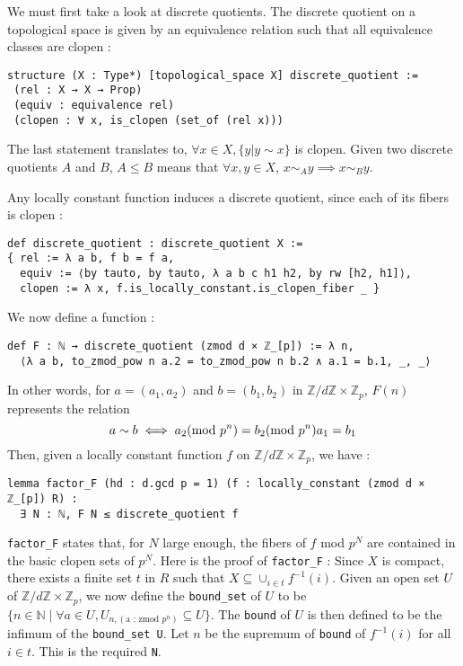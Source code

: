\documentclass[a4paper,UKenglish,cleveref, autoref, thm-restate]{lipics-v2021}
\newcommand{\lean}[1]{\texttt{#1}\xspace} %
\begin{document}
We must first take a look at discrete quotients. The discrete quotient on a topological space is given by an equivalence relation such 
that all equivalence classes are clopen : 
\begin{lstlisting}
structure (X : Type*) [topological_space X] discrete_quotient :=
 (rel : X → X → Prop)
 (equiv : equivalence rel)
 (clopen : ∀ x, is_clopen (set_of (rel x)))
\end{lstlisting}

The last statement translates to, $\forall x \in X, \{ y | y \sim x \}$ is clopen. 
Given two discrete quotients $A$ and $B$, $A \le B$ means that $\forall x,y \in X$, 
$x \sim_{A} y \implies x \sim_{B} y$. 

Any locally constant function induces a discrete quotient, since each of its fibers is clopen : 
\begin{lstlisting}
def discrete_quotient : discrete_quotient X :=
{ rel := λ a b, f b = f a,
  equiv := ⟨by tauto, by tauto, λ a b c h1 h2, by rw [h2, h1]⟩,
  clopen := λ x, f.is_locally_constant.is_clopen_fiber _ }
\end{lstlisting}

We now define a function : 
\begin{lstlisting}
def F : ℕ → discrete_quotient (zmod d × ℤ_[p]) := λ n, 
  ⟨λ a b, to_zmod_pow n a.2 = to_zmod_pow n b.2 ∧ a.1 = b.1, _, _⟩
\end{lstlisting}

In other words, for $a = (a_1, a_2)$ and $b = (b_1, b_2)$ in $\mathbb{Z}/d \mathbb{Z} \times \mathbb{Z}_p$, $F(n)$ represents the relation 
$$ a \sim b \iff a_2 (\text{mod } p^n) = b_2 (\text{mod } p^n) \and a_1 = b_1 $$
Then, given a locally constant function $f$ on $\mathbb{Z}/d \mathbb{Z} \times \mathbb{Z}_p$, we have :
\begin{lstlisting}
lemma factor_F (hd : d.gcd p = 1) (f : locally_constant (zmod d × ℤ_[p]) R) :
  ∃ N : ℕ, F N ≤ discrete_quotient f
\end{lstlisting}

\lean{factor\_F} states that, for $N$ large enough, the fibers of $f$ mod $p^N$ are contained in the basic clopen sets of $p^N$. 
Here is the proof of \lean{factor\_F} : Since $X$ is compact, there exists a finite set $t$ in $R$ such that $X \subseteq \cup_{i \in t} f^{-1} (i)$. 
Given an open set $U$ of $\mathbb{Z}/d \mathbb{Z} \times \mathbb{Z}_p$, we now define the \lean{bound\_set} of $U$ to be 
\newline $\{ n \in \mathbb{N} \mid \forall a \in U, U_{n, (\text{a : zmod }p^n)} \subseteq U \}$. The \lean{bound} of $U$ is then defined to be the infimum of the \lean{bound\_set U}. 
Let $n$ be the supremum of \lean{bound} of $f^{-1} (i)$ for all $i \in t$. This is the required \lean{N}. 
\end{document}
